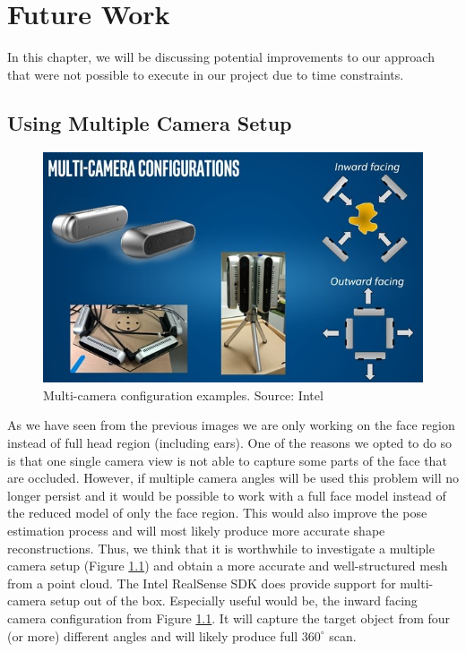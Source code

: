\chapter{Future Work}\label{ch6}

In this chapter, we will be discussing potential improvements to our approach that were not possible to execute in our project due to time constraints. 

\section{Using Multiple Camera Setup}
\begin{figure}[h]
    \centering
    \includegraphics[width=\textwidth]{Figures/Pictures/multicam.jpg}
    \caption{Multi-camera configuration examples. Source: Intel}
    \label{f6.1}
\end{figure}
As we have seen from the previous images we are only working on the face region instead of full head region (including ears). One of the reasons we opted to do so is that one single camera view is not able to capture some parts of the face that are occluded. However, if multiple camera angles will be used this problem will no longer persist and it would be possible to work with a full face model instead of  the reduced model of only the face region. This would also improve the pose estimation process and will most likely produce more accurate shape reconstructions. Thus, we think that it is worthwhile to investigate a multiple camera setup (Figure \ref{f6.1}) and obtain a more accurate and well-structured mesh from a point cloud. The Intel RealSense SDK does provide support for multi-camera setup out of the box\cite{multicam}. Especially useful would be, the inward facing camera configuration from Figure \ref{f6.1}. It will capture the target object from four (or more) different angles and will likely produce full $360^{\circ}$ scan.\bigskip

